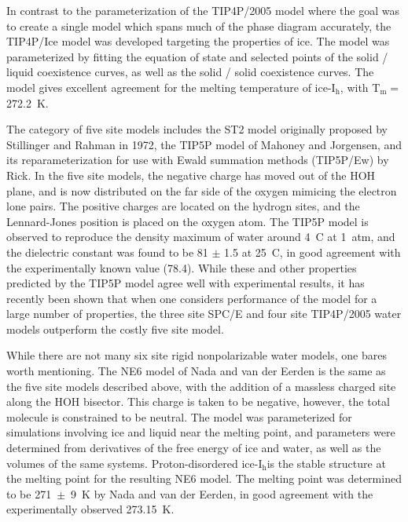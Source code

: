 In contrast to the parameterization of the TIP4P/2005 model where the
goal was to create a single model which spans much of the phase
diagram accurately, the TIP4P/Ice model was developed targeting the
properties of ice. The model was parameterized by fitting the equation
of state and selected points of the solid / liquid coexistence curves,
as well as the solid / solid coexistence curves. The model gives
excellent agreement for the melting temperature of ice-I$_\mathrm{h}$,
with T$_\mathrm{m} = $272.2~K. 

The category of five site models includes the ST2 model originally
proposed by Stillinger and Rahman in 1972\cite{Stillinger1974}, the
TIP5P model of Mahoney and Jorgensen\cite{Mahoney2000}, and its
reparameterization for use with Ewald summation methods (TIP5P/Ew) by
Rick.\cite{Rick2004} In the five site models, the negative charge has
moved out of the HOH plane, and is now distributed on the far side of
the oxygen mimicing the electron lone pairs. The positive charges are
located on the hydrogn sites, and the Lennard-Jones position is placed
on the oxygen atom. The TIP5P model is observed to reproduce the
density maximum of water around 4\degree~C at 1~atm, and the
dielectric constant was found to be 81 $\pm$ 1.5 at 25\degree~C, in
good agreement with the experimentally known value (78.4). While these
and other properties predicted by the TIP5P model agree well with
experimental results, it has recently been shown that when one
considers performance of the model for a large number of properties,
the three site SPC/E and four site TIP4P/2005 water models outperform
the costly five site model. 

While there are not many six site rigid nonpolarizable water models,
one bares worth mentioning. The NE6 model of Nada and van der Eerden
is the same as the five site models described above, with the addition
of a massless charged site along the HOH bisector.\cite{Nada2003a}
This charge is taken to be negative, however, the total molecule is
constrained to be neutral. The model was parameterized for simulations
involving ice and liquid near the melting point, and parameters were
determined from derivatives of the free energy of ice and water, as
well as the volumes of the same systems. Proton-disordered
ice-I$_\mathrm{h}$is the stable structure at the melting point for the
resulting NE6 model. The melting point was determined to be
271~$\pm$~9~K by Nada and van der Eerden, in good agreement with the
experimentally observed 273.15~K.

